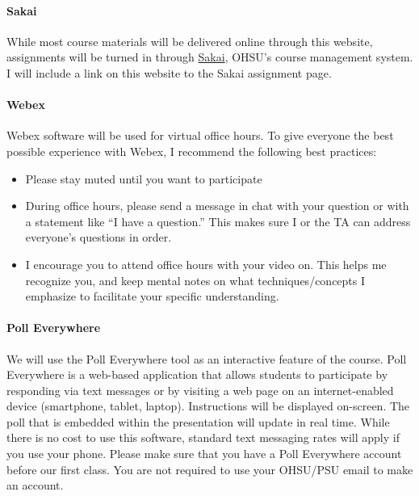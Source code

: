 \documentclass[
  letterpaper,
  DIV=11,
  numbers=noendperiod]{scrartcl}
\let\oldparagraph\paragraph
\renewcommand{\paragraph}[1]{\oldparagraph{#1}\mbox{}}
\providecommand{\tightlist}{%
  \setlength{\itemsep}{0pt}\setlength{\parskip}{0pt}}\usepackage{longtable,booktabs,array}
\begin{document}
\hypertarget{sakai}{%
\paragraph{Sakai}\label{sakai}}

While most course materials will be delivered online through this
website, assignments will be turned in through
\href{https://sakai.ohsu.edu/}{Sakai}, OHSU's course management system.
I will include a link on this website to the Sakai assignment page.~

\hypertarget{webex}{%
\paragraph{Webex}\label{webex}}

Webex software will be used for virtual office hours. To give everyone
the best possible experience with Webex, I recommend the following best
practices:

\begin{itemize}
\tightlist
\item
  Please stay muted until you want to participate
\item
  During office hours, please send a message in chat with your question
  or with a statement like ``I have a question.'' This makes sure I or
  the TA can address everyone's questions in order.~
\item
  I encourage you to attend office hours with your video on. This helps
  me recognize you, and keep mental notes on what techniques/concepts I
  emphasize to facilitate your specific understanding.~
\end{itemize}

\hypertarget{poll-everywhere}{%
\paragraph{Poll Everywhere}\label{poll-everywhere}}

We will use the Poll Everywhere tool as an interactive feature of the
course. Poll Everywhere is a web-based application that allows students
to participate by responding via text messages or by visiting a web page
on an internet-enabled device (smartphone, tablet, laptop). Instructions
will be displayed on-screen. The poll that is embedded within the
presentation will update in real time. While there is no cost to use
this software, standard text messaging rates will apply if you use your
phone. Please make sure that you have a Poll Everywhere account before
our first class. You are not required to use your OHSU/PSU email to make
an account.~
\end{document}

